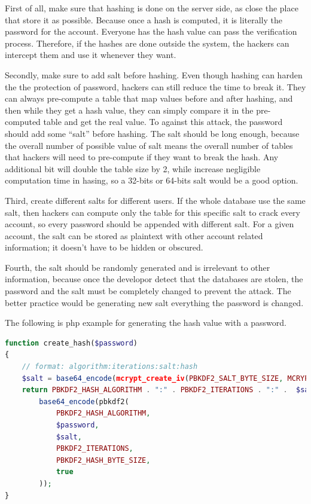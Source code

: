 \documentclass[conference]{IEEEtran}
\begin{document}
First of all, make sure that hashing is done on the server side,
as close the place that store it as possible. Because
once a hash is computed, it is literally the password for the account.
Everyone has the hash value can pass the verification process. Therefore,
if the hashes are done outside the system, the hackers can intercept them
and use it whenever they want.

Secondly, make sure to add salt before hashing.
Even though hashing can harden the the protection of password,
hackers can still reduce the time to break it.
They can always pre-compute a table \cite{rainbow} that map
values before and after hashing, and then while they get a
hash value, they can simply compare it in the pre-computed table and
get the real value. To against this attack, the password should add some
``salt'' \cite{salt} before hashing.
The salt should be long enough, because the overall number of
possible value of salt means the overall number of tables that
hackers will need to pre-compute if they want to break the hash.
Any additional bit will double the table size by 2, while
increase negligible computation time in hasing, so a
32-bits or 64-bits salt would be a good option.

Third, create different salts for different users.
If the whole database use the same salt, then hackers
can compute only the table for this specific salt to crack
every account, so every password should be appended with
different salt. For a given account, the salt can be stored as plaintext
with other account related information; it doesn't have to be hidden or obscured.

Fourth, the salt should be randomly generated and is irrelevant to other
information, because once the developor detect that the databases
are stolen, the password and the salt must be completely changed to
prevent the attack. The better practice would be generating new salt
everything the password is changed.

The following is php example \cite{salt_example}
for generating the hash value with a password.
\begin{lstlisting}[language=php]
function create_hash($password)
{
    // format: algorithm:iterations:salt:hash
    $salt = base64_encode(mcrypt_create_iv(PBKDF2_SALT_BYTE_SIZE, MCRYPT_DEV_URANDOM));
    return PBKDF2_HASH_ALGORITHM . ":" . PBKDF2_ITERATIONS . ":" .  $salt . ":" .
        base64_encode(pbkdf2(
            PBKDF2_HASH_ALGORITHM,
            $password,
            $salt,
            PBKDF2_ITERATIONS,
            PBKDF2_HASH_BYTE_SIZE,
            true
        ));
}
\end{lstlisting}
\end{document}
